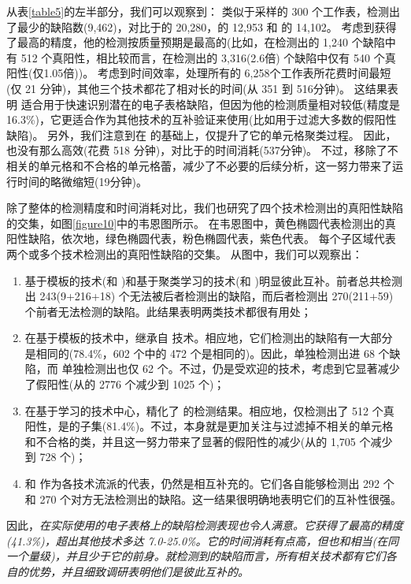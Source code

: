 从表\ref{table5}的左半部分，我们可以观察到：
类似于采样的 300 个工作表，\wa 检测出了最少的缺陷数(9,462)，对比于\am 的 20,280，\ca 的 12,953 和 \cu 的 14,102。
考虑到\wa 获得了最高的精度，他的检测按质量预期是最高的(比如，在\wa 检测出的 1,240 个缺陷中有 512 个真阳性，相比较而言，在\am 检测出的 3,316(2.6倍) 个缺陷中仅有 540 个真阳性(仅1.05倍))。
考虑到时间效率，\am 处理所有的 6,258个工作表所花费时间最短(仅 21 分钟)，其他三个技术都花了相对长的时间(从 351 到 516分钟)。
这结果表明 \am 适合用于快速识别潜在的电子表格缺陷，但因为他的检测质量相对较低(精度是16.3\%)，它更适合作为其他技术的互补验证来使用(比如用于过滤大多数的假阳性缺陷)。
另外，我们注意到\wa 在 \cu 的基础上，仅提升了它的单元格聚类过程。
因此，\wa 也没有那么高效(花费 518 分钟)，对比于\cu 的时间消耗(537分钟)。
不过，\wa 移除了不相关的单元格和不合格的单元格蕾，减少了不必要的后续分析，这一努力带来了运行时间的略微缩短(19分钟)。

除了整体的检测精度和时间消耗对比，我们也研究了四个技术检测出的真阳性缺陷的交集，如图\ref{figure10}中的韦恩图所示。
在韦恩图中，黄色椭圆代表\am 检测出的真阳性缺陷，依次地，绿色椭圆代表\ca ，粉色椭圆代表\cu ，紫色代表\wa 。
每个子区域代表两个或多个技术检测出的真阳性缺陷的交集。
从图中，我们可以观察出：
\begin{enumerate}
    \item 基于模板的技术(\am 和 \ca)和基于聚类学习的技术(\cu 和 \wa)明显彼此互补。前者总共检测出 243(9+216+18) 个无法被后者检测出的缺陷，而后者检测出 270(211+59) 个前者无法检测的缺陷。此结果表明两类技术都很有用处；
    \item 在基于模板的技术中，\ca 继承自 \am 技术。相应地，它们检测出的缺陷有一大部分是相同的(78.4\%，602 个中的 472 个是相同的)。因此，\am 单独检测出进 68 个缺陷，而 \ca 单独检测出也仅 62 个。不过，\ca 仍是受欢迎的技术，考虑到它显著减少了假阳性(从\am 的 2776 个减少到 1025 个)；
    \item 在基于学习的技术中心，\wa 精化了 \cu 的检测结果。相应地，\wa 仅检测出了 512 个真阳性，是\cu 的子集(81.4\%)。不过，\wa 本身就是更加关注与过滤掉不相关的单元格和不合格的类，并且这一努力带来了显著的假阳性的减少(从\cu 的 1,705 个减少到 728 个)；
    \item \ca 和 \wa 作为各技术流派的代表，仍然是相互补充的。它们各自能够检测出 292 个和 270 个对方无法检测出的缺陷。这一结果很明确地表明它们的互补性很强。
\end{enumerate}

因此，\textit{\wa 在实际使用的电子表格上的缺陷检测表现也令人满意。它获得了最高的精度(41.3\%)，超出其他技术多达 7.0-25.0\%。它的时间消耗有点高，但也和\ca 相当(在同一个量级)，并且少于它的前身\cu。就检测到的缺陷而言，所有相关技术都有它们各自的优势，并且细致调研表明他们是彼此互补的。}
